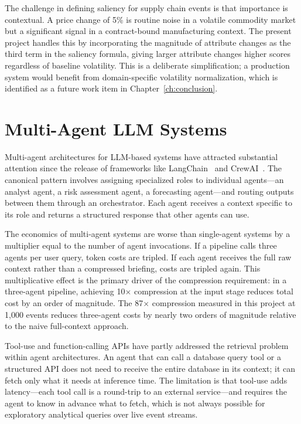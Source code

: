 The challenge in defining saliency for supply chain events is that importance is contextual.
A price change of 5\% is routine noise in a volatile commodity market but a significant
signal in a contract-bound manufacturing context. The present project handles this
by incorporating the magnitude of attribute changes as the third term in the saliency
formula, giving larger attribute changes higher scores regardless of baseline volatility.
This is a deliberate simplification; a production system would benefit from domain-specific
volatility normalization, which is identified as a future work item in
Chapter~\ref{ch:conclusion}.

\section{Multi-Agent LLM Systems}
\label{sec:multi_agent}

Multi-agent architectures for LLM-based systems have attracted substantial attention since
the release of frameworks like LangChain~\citep{chase2022langchain} and
CrewAI~\citep{crewai2024}. The canonical pattern involves assigning specialized roles to
individual agents---an analyst agent, a risk assessment agent, a forecasting agent---and
routing outputs between them through an orchestrator. Each agent receives a context
specific to its role and returns a structured response that other agents can use.

The economics of multi-agent systems are worse than single-agent systems by a multiplier
equal to the number of agent invocations. If a pipeline calls three agents per user
query, token costs are tripled. If each agent receives the full raw context rather than
a compressed briefing, costs are tripled again. This multiplicative effect is the primary
driver of the compression requirement: in a three-agent pipeline, achieving 10$\times$
compression at the input stage reduces total cost by an order of magnitude. The 87$\times$
compression measured in this project at 1,000 events reduces three-agent costs by nearly
two orders of magnitude relative to the naive full-context approach.

Tool-use and function-calling APIs have partly addressed the retrieval problem within
agent architectures. An agent that can call a database query tool or a structured API
does not need to receive the entire database in its context; it can fetch only what it
needs at inference time. The limitation is that tool-use adds latency---each tool call is
a round-trip to an external service---and requires the agent to know in advance what to
fetch, which is not always possible for exploratory analytical queries over live event
streams.


